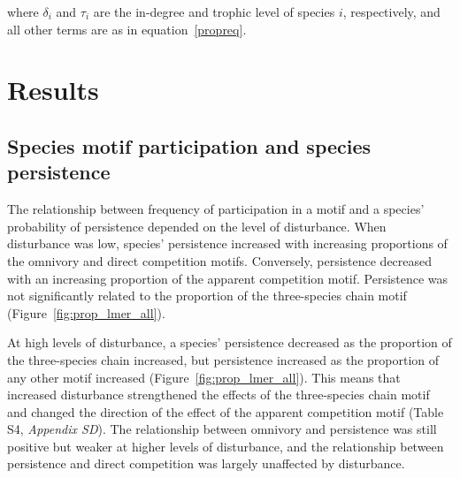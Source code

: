 \documentclass[12pt]{article}
\begin{document}
\begin{spacing}{2.0}
        where $\delta_{i}$ and $\tau_i$ are the in-degree and trophic level of species $i$, respectively, and all other terms are as in equation~\ref{propreq}. 


\section*{Results}


    \subsection*{Species motif participation and species persistence} 
    
       The relationship between frequency of participation in a motif and a species' probability of persistence depended on the level of disturbance. 
       When disturbance was low, species' persistence increased with increasing proportions of the omnivory and direct competition motifs. 
       Conversely, persistence decreased with an increasing proportion of the apparent competition motif. 
       Persistence was not significantly related to the proportion of the three-species chain motif (Figure~\ref{fig:prop_lmer_all}).
            
            
        At high levels of disturbance, a species' persistence decreased as the proportion of the three-species chain increased, but persistence increased as the proportion of any other motif increased (Figure~\ref{fig:prop_lmer_all}). 
        This means that increased disturbance strengthened the effects of the three-species chain motif and changed the direction of the effect of the apparent competition motif  (Table S4, \emph{Appendix SD}).
        The relationship between omnivory and persistence was still positive but weaker at higher levels of disturbance, and the relationship between persistence and direct competition was largely unaffected by disturbance.
    

\end{spacing}
\end{document}

